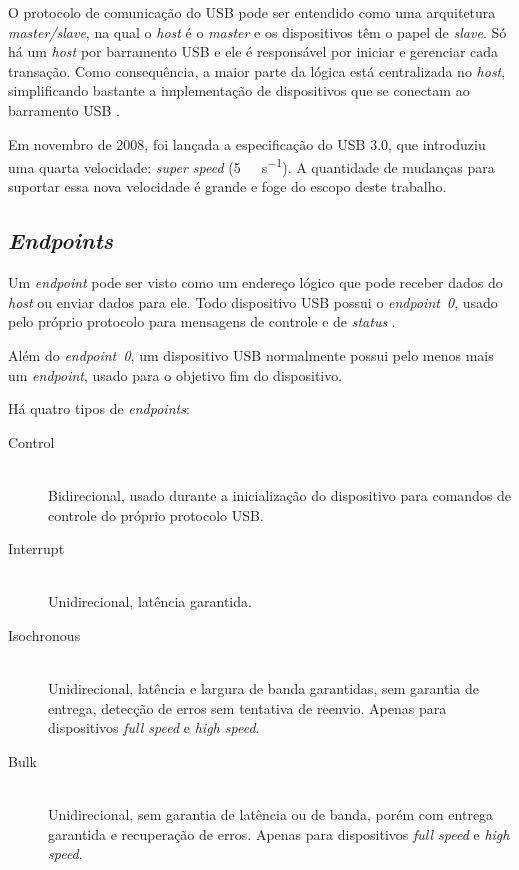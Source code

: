 \documentclass[brazil,pagestart=firstchapter]{abnt}
\begin{document}
O protocolo de comunicação do \ac{USB} pode ser entendido como uma
arquitetura \textit{master/slave}, na qual o \textit{host} é o
\textit{master} e os dispositivos têm o papel de \textit{slave}. Só há um
\textit{host} por barramento \ac{USB} e ele é responsável por iniciar e
gerenciar cada transação. Como consequência, a maior parte da lógica está
centralizada no \textit{host}, simplificando bastante a implementação de
dispositivos que se conectam ao barramento \ac{USB} \cite{usbinanutshell}.

Em novembro de 2008, foi lançada a especificação do USB 3.0, que introduziu
uma quarta velocidade: \textit{super speed} (\SI{5}{\giga\bit\per\second}).
A quantidade de mudanças para suportar essa nova velocidade é grande e foge
do escopo deste trabalho.


\subsection{\textit{Endpoints}}
\label{sub:usb_endpoints}

Um \textit{endpoint} pode ser visto como um endereço lógico que pode receber
dados do \textit{host} ou enviar dados para ele. Todo dispositivo \ac{USB}
possui o \textit{endpoint~0}, usado pelo próprio protocolo para mensagens de
controle e de \textit{status} \cite{usbinanutshell}.

Além do \textit{endpoint~0}, um dispositivo \ac{USB} normalmente possui pelo
menos mais um \textit{endpoint}, usado para o objetivo fim do dispositivo.

Há quatro tipos de \textit{endpoints}: \cite{usbinanutshell}

\begin{description}
\item[Control] \hfill \\
	Bidirecional, usado durante a inicialização do dispositivo para comandos
	de controle do próprio protocolo \ac{USB}.
\item[Interrupt] \hfill \\
	Unidirecional, latência garantida.
\item[Isochronous] \hfill \\
	Unidirecional, latência e largura de banda garantidas, sem garantia de
	entrega, detecção de erros sem tentativa de reenvio. Apenas para
	dispositivos \textit{full speed} e \textit{high speed}.
\item[Bulk] \hfill \\
	Unidirecional, sem garantia de latência ou de banda, porém com entrega
	garantida e recuperação de erros. Apenas para dispositivos \textit{full
	speed} e \textit{high speed}.
\end{description}
\end{document}
